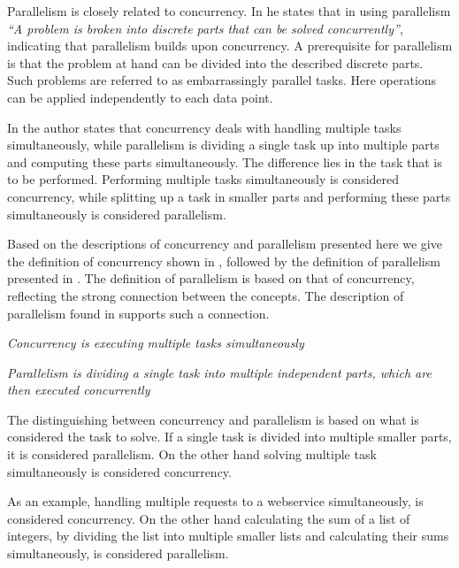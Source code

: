 Parallelism is closely related to concurrency. In \cite{introPar} he states that in using parallelism \textit{``A problem is broken into discrete parts that can be solved concurrently''}, indicating that parallelism builds upon concurrency. A prerequisite for parallelism is that the problem at hand can be divided into the described discrete parts. Such problems are referred to as embarrassingly parallel tasks\cite{sutter2005software}. Here operations can be applied independently to each data point.

In \cite[p. 24]{sevenModels} the author states that concurrency deals with handling multiple tasks simultaneously, while parallelism is dividing a single task up into multiple parts and computing these parts simultaneously. The difference lies in the task that is to be performed. Performing multiple tasks simultaneously is considered concurrency, while splitting up a task in smaller parts and performing these parts simultaneously is considered parallelism.

Based on the descriptions of concurrency and parallelism presented here we give the definition of concurrency shown in , followed by the definition of parallelism presented in . The definition of parallelism is based on that of concurrency, reflecting the strong connection between the concepts. The description of parallelism found in \cite{introPar} supports such a connection.
\begin{defn}\label{def:concurrency}
\emph{Concurrency is executing multiple tasks simultaneously}
\end{defn}

\begin{defn}\label{def:parallelism}
\emph{Parallelism is dividing a single task into multiple independent parts, which are then executed concurrently}
\end{defn}
The distinguishing between concurrency and parallelism is based on what is considered the task to solve. If a single task is divided into multiple smaller parts, it is considered parallelism. On the other hand solving multiple task simultaneously is considered concurrency.

As an example, handling multiple requests to a webservice simultaneously, is considered concurrency. On the other hand calculating the sum of a list of integers, by dividing the list into multiple smaller lists and calculating their sums simultaneously, is considered parallelism.


